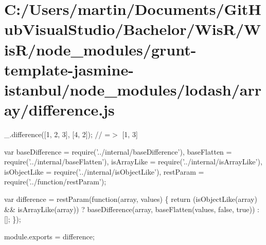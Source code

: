 \hypertarget{_c_1_2_users_2martin_2_documents_2_git_hub_visual_studio_2_bachelor_2_wis_r_2_wis_r_2node_module9dc42adaa0a5d3326ce46f3968e47387}{}\section{C\+:/\+Users/martin/\+Documents/\+Git\+Hub\+Visual\+Studio/\+Bachelor/\+Wis\+R/\+Wis\+R/node\+\_\+modules/grunt-\/template-\/jasmine-\/istanbul/node\+\_\+modules/lodash/array/difference.\+js}
\+\_\+.\+difference(\mbox{[}1, 2, 3\mbox{]}, \mbox{[}4, 2\mbox{]}); // =$>$ \mbox{[}1, 3\mbox{]}


\begin{DoxyCodeInclude}
var baseDifference = require(\textcolor{stringliteral}{'../internal/baseDifference'}),
    baseFlatten = require(\textcolor{stringliteral}{'../internal/baseFlatten'}),
    isArrayLike = require(\textcolor{stringliteral}{'../internal/isArrayLike'}),
    isObjectLike = require(\textcolor{stringliteral}{'../internal/isObjectLike'}),
    restParam = require(\textcolor{stringliteral}{'../function/restParam'});

var difference = restParam(\textcolor{keyword}{function}(array, values) \{
  \textcolor{keywordflow}{return} (isObjectLike(array) && isArrayLike(array))
    ? baseDifference(array, baseFlatten(values, \textcolor{keyword}{false}, \textcolor{keyword}{true}))
    : [];
\});

module.exports = difference;
\end{DoxyCodeInclude}
 